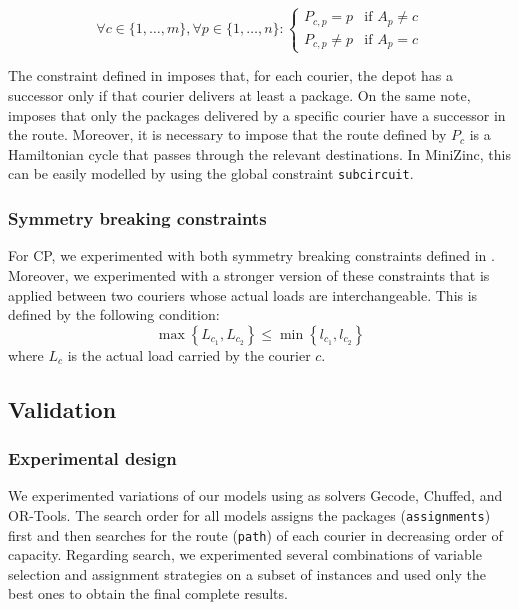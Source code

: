 \begin{equation}
    \label{eq:cp_constr_route_packs}
    \forall c \in \{ 1, \dots, m \},
    \forall p \in \{ 1, \dots, n \}: 
    \begin{cases}
        P_{c, p} = p    & \text{if $A_p \neq c$} \\
        P_{c, p} \neq p & \text{if $A_p = c$} 
    \end{cases}
\end{equation}

The constraint defined in  imposes that, for each courier, the depot has a successor only if that courier delivers at least a package. On the same note,  imposes that only the packages delivered by a specific courier have a successor in the route.
Moreover, it is necessary to impose that the route defined by $P_c$ is a Hamiltonian cycle that passes through the relevant destinations. In MiniZinc, this can be easily modelled by using the global constraint \texttt{subcircuit}.


\subsubsection{Symmetry breaking constraints}

For CP, we experimented with both symmetry breaking constraints defined in . Moreover, we experimented with a stronger version of these constraints that is applied between two couriers whose actual loads are interchangeable. This is defined by the following condition:
\begin{equation}
    \label{eq:cp_symm_strong}
    \max\left\{ L_{c_1}, L_{c_2} \right\} \leq \min\left\{ l_{c_1}, l_{c_2} \right\}
\end{equation}
where $L_c$ is the actual load carried by the courier $c$.



\subsection{Validation}

\subsubsection{Experimental design}

We experimented variations of our models using as solvers Gecode, Chuffed, and OR-Tools. The search order for all models assigns the packages (\texttt{assignments}) first and then searches for the route (\texttt{path}) of each courier in decreasing order of capacity. Regarding search, we experimented several combinations of variable selection and assignment strategies on a subset of instances and used only the best ones to obtain the final complete results.


